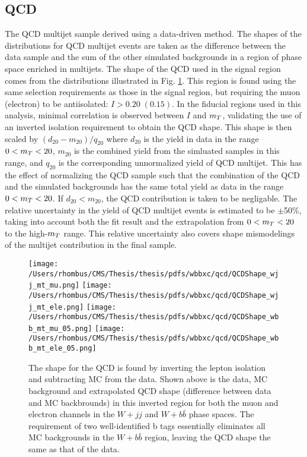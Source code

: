 \subsection{QCD}
\label{sec:qcd}
The QCD multijet sample derived using a data-driven method. 
The shapes of the distributions for QCD multijet events are taken as the difference between
 the data sample and the sum of the other simulated backgrounds in a region of phase
 space enriched in multijets.
The shape of the QCD used in the signal region comes from the distributions 
 illustrated in Fig. \ref{fig:qcdshape}.
This region is found using the same selection requirements as those in the signal region,
 but requiring the muon (electron) to be antiisolated: $I > 0.20 \; (0.15)$.
In the fiducial regions used in this analysis, minimal correlation
 is observed between $I$ and $m_T$, validating
 the use of an inverted isolation requirement to obtain
 the QCD shape.
This shape is then scaled by $ (d_{20}-m_{20})/q_{20} $ where
 $d_{20}$ is the yield in data in the range $0<m_T<20$, $m_{20}$ is the combined
 yield from the simluated samples in this range, and $q_{20}$ is the corresponding
 unnormalized yield of QCD multijet.
This has the effect of normalizing the QCD sample such that the combination of the QCD 
 and the simulated backgrounds has the same total yield as data in the range $0<m_T<20$.
If $d_{20}<m_{20}$, the QCD contribution is taken to be negligable. %
The relative uncertainty in the yield of QCD multijet events is
 estimated to be $\pm$50\%, taking into account both the fit result
 and the extrapolation from $0<m_T<20$ to the high-$m_T$ range.
This relative uncertainty also covers shape mismodelings
 of the multijet contribution in the final sample.


\begin{figure}
 \caption[QCD shape for \wbb analysis]
 {The shape for the QCD is found by inverting the lepton
  isolation and subtracting MC from the data.
  Shown above is the data, MC background and 
   extrapolated QCD shape (difference between data
   and MC backbrounds) in this inverted
   region for both the muon and electron channels
   in the $W+jj$ and $W+b\bar{b}$ phase spaces.
  The requirement of two well-identified b tags
   essentially eliminates all MC backgrounds in
   the $W+b\bar{b}$ region, leaving the QCD shape 
   the same as that of the data.
  }
 \center
\label{fig:qcd_mu}\texttt{[image: /Users/rhombus/CMS/Thesis/thesis/pdfs/wbbxc/qcd/QCDShape\_wjj\_mt\_mu.png]}
\label{fig:qcd_mu}\texttt{[image: /Users/rhombus/CMS/Thesis/thesis/pdfs/wbbxc/qcd/QCDShape\_wjj\_mt\_ele.png]}
\label{fig:qcd_mu}\texttt{[image: /Users/rhombus/CMS/Thesis/thesis/pdfs/wbbxc/qcd/QCDShape\_wbb\_mt\_mu\_05.png]}
\label{fig:qcd_mu}\texttt{[image: /Users/rhombus/CMS/Thesis/thesis/pdfs/wbbxc/qcd/QCDShape\_wbb\_mt\_ele\_05.png]}
 \label{fig:qcdshape}
\end{figure}



